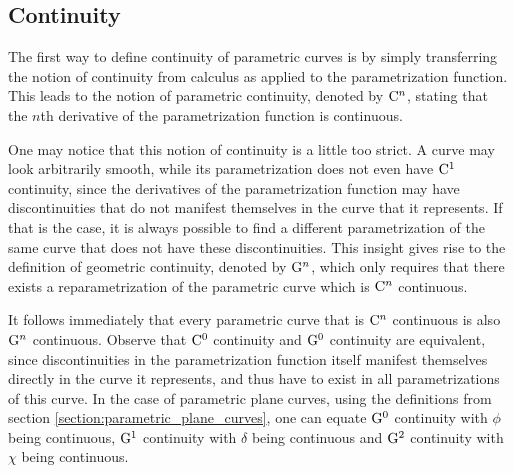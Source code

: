 \documentclass[a4paper]{article}
\begin{document}
		\subsection{Continuity}
		\label{section:continuity}

			The first way to define continuity of parametric curves is by simply transferring the notion of continuity from calculus as applied to the parametrization function. This leads to the notion of parametric continuity, denoted by \(\mathrm{C}^{n}\), stating that the \(n\)th derivative of the parametrization function is continuous.

			One may notice that this notion of continuity is a little too strict. A curve may look arbitrarily smooth, while its parametrization does not even have \(\mathrm{C}^{1}\) continuity, since the derivatives of the parametrization function may have discontinuities that do not manifest themselves in the curve that it represents. If that is the case, it is always possible to find a different parametrization of the same curve that does not have these discontinuities. This insight gives rise to the definition of geometric continuity, denoted by \(\mathrm{G}^{n}\), which only requires that there exists a reparametrization of the parametric curve which is \(\mathrm{C}^{n}\) continuous.

			It follows immediately that every parametric curve that is \(\mathrm{C}^{n}\) continuous is also \(\mathrm{G}^{n}\) continuous. Observe that \(\mathrm{C}^{0}\) continuity and \(\mathrm{G}^{0}\) continuity are equivalent, since discontinuities in the parametrization function itself manifest themselves directly in the curve it represents, and thus have to exist in all parametrizations of this curve. In the case of parametric plane curves, using the definitions from section \ref{section:parametric_plane_curves}, one can equate \(\mathrm{G}^{0}\) continuity with \(\phi\) being continuous, \(\mathrm{G}^{1}\) continuity with \(\delta\) being continuous and \(\mathrm{G}^{2}\) continuity with \(\chi\) being continuous.

	\clearpage
\end{document}
